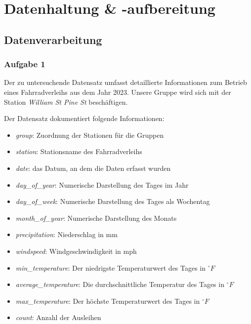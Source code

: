 \documentclass[a4paper, 12pt]{article}
\begin{document}
\newpage

\section{Datenhaltung \& -aufbereitung}

\subsection{Datenverarbeitung}
\subsubsection{Aufgabe 1}

Der zu untersuchende Datensatz umfasst detaillierte Informationen zum Betrieb eines Fahrradverleihs aus dem Jahr 2023. Unsere Gruppe wird sich mit der Station \textit{William St \And Pine St} beschäftigen. 
\par
\par
\vspace{\baselineskip}

\noindent Der Datensatz dokumentiert folgende Informationen:

\begin{itemize}
    \item \textit{group}: Zuordnung der Stationen für die Gruppen
    \item \textit{station}: Stationsname des Fahrradverleihs
    \item \textit{date}: das Datum, an dem die Daten erfasst wurden 
    \item \textit{day\_of\_year}: Numerische Darstellung des Tages im Jahr
    \item \textit{day\_of\_week}: Numerische Darstellung des Tages als Wochentag
    \item \textit{month\_of\_year}: Numerische Darstellung des Monats
    \item \textit{precipitation}: Niederschlag in mm
    \item \textit{windspeed}: Windgeschwindigkeit in mph
    \item \textit{min\_temperature}: Der niedrigste Temperaturwert des Tages in \(^\circ F \)
    \item \textit{average\_temperature}: Die durchschnittliche Temperatur des Tages 
    in \(^\circ F \)
    \item \textit{max\_temperature}: Der höchste Temperaturwert des Tages in \(^\circ F \)
    \item \textit{count}: Anzahl der Ausleihen
    
\vspace{\baselineskip}
    
\end{itemize}
\end{document}
